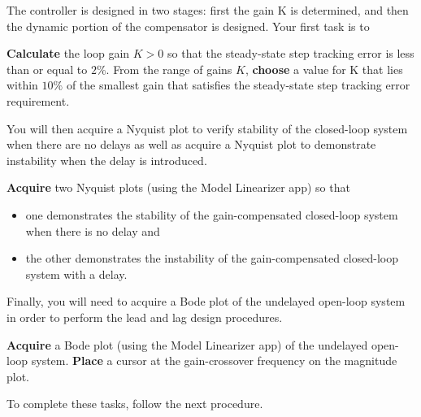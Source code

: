 The controller is designed in two stages: first the gain K is determined, and then the dynamic portion of the compensator is designed.
Your first task is to
%
\begin{deliverable}[label={del:lab5:p1:1}]
	\textbf{Calculate} the loop gain \(K>0\) so that the steady-state step tracking error is less than or equal to \(2\%.\)  From the range of gains \(K\), \textbf{choose} a value for K that lies within \(10\%\) of the smallest gain that satisfies the steady-state step tracking error requirement.
\end{deliverable}
%
You will then acquire a Nyquist plot to verify stability of the closed-loop system when there are no delays as well as acquire a Nyquist plot to demonstrate instability when the delay is introduced.
%
\begin{deliverable}[label={del:lab5:p1:2}]
  \textbf{Acquire} two Nyquist plots (using the Model Linearizer app) so that
  \begin{itemize}
    \item{one demonstrates the stability of the gain-compensated closed-loop system when there is no delay and}
    \item{the other demonstrates the instability of the gain-compensated closed-loop system with a delay.}
  \end{itemize}
\end{deliverable}
%
Finally, you will need to acquire a Bode plot of the undelayed open-loop system in order to perform the lead and lag design procedures.
%
\begin{deliverable}[label={del:lab5:p1:3}]
  \textbf{Acquire} a Bode plot (using the Model Linearizer app) of the undelayed open-loop system.
  \textbf{Place} a cursor at the gain-crossover frequency on the magnitude plot.
\end{deliverable}
%
To complete these tasks, follow the next procedure.
%
